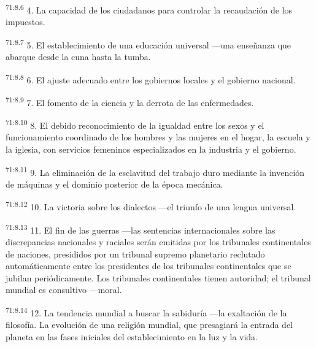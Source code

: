 \documentclass[twoside, 11pt]{book}
\begin{document}
\par
\textsuperscript{71:8.6} 4. La capacidad de los ciudadanos para controlar la recaudación de los impuestos.

\par
\textsuperscript{71:8.7} 5. El establecimiento de una educación universal ---una enseñanza que abarque desde la cuna hasta la tumba.

\par
\textsuperscript{71:8.8} 6. El ajuste adecuado entre los gobiernos locales y el gobierno nacional.

\par
\textsuperscript{71:8.9} 7. El fomento de la ciencia y la derrota de las enfermedades.

\par
\textsuperscript{71:8.10} 8. El debido reconocimiento de la igualdad entre los sexos y el funcionamiento coordinado de los hombres y las mujeres en el hogar, la escuela y la iglesia, con servicios femeninos especializados en la industria y el gobierno.

\par
\textsuperscript{71:8.11} 9. La eliminación de la esclavitud del trabajo duro mediante la invención de máquinas y el dominio posterior de la época mecánica.

\par
\textsuperscript{71:8.12} 10. La victoria sobre los dialectos ---el triunfo de una lengua universal.

\par
\textsuperscript{71:8.13} 11. El fin de las guerras ---las sentencias internacionales sobre las discrepancias nacionales y raciales serán emitidas por los tribunales continentales de naciones, presididos por un tribunal supremo planetario reclutado automáticamente entre los presidentes de los tribunales continentales que se jubilan periódicamente. Los tribunales continentales tienen autoridad; el tribunal mundial es consultivo ---moral.

\par
\textsuperscript{71:8.14} 12. La tendencia mundial a buscar la sabiduría ---la exaltación de la filosofía. La evolución de una religión mundial, que presagiará la entrada del planeta en las fases iniciales del establecimiento en la luz y la vida.
\end{document}
